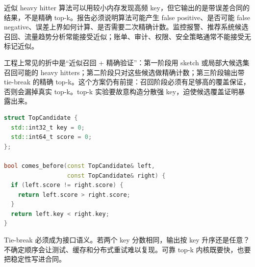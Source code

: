 近似 heavy hitter 算法可以用较小内存发现高频 key，但它输出的是带误差合同的结果，不是精确 top-k。报告必须说明算法可能产生 false positive、是否可能 false negative、误差上界如何计算、是否需要二次精确计数。监控报警、推荐系统候选召回、流量趋势分析常能接受近似；账单、审计、权限、安全策略通常不能接受无标记近似。

工程上常见的折中是“近似召回 + 精确验证”：第一阶段用 sketch 或局部大候选集召回可能的 heavy hitters；第二阶段只对这些候选做精确计数；第三阶段输出带 tie-break 的精确 top-k。这个方案仍有前提：召回阶段必须有足够高的覆盖保证，否则会漏掉真实 top-k。top-k 实验要故意构造分散强 key，迫使候选覆盖证明暴露出来。

\begin{lstlisting}[language=C++,caption={确定性 top-k 候选的接口形态}]
struct TopCandidate {
  std::int32_t key = 0;
  std::int64_t score = 0;
};

bool comes_before(const TopCandidate& left,
                  const TopCandidate& right) {
  if (left.score != right.score) {
    return left.score > right.score;
  }
  return left.key < right.key;
}
\end{lstlisting}

Tie-break 必须成为接口语义。若两个 key 分数相同，输出按 key 升序还是任意？不确定顺序会让测试、缓存和分布式重试难以复现。可靠 top-k 内核既要快，也要把稳定性写进合同。

